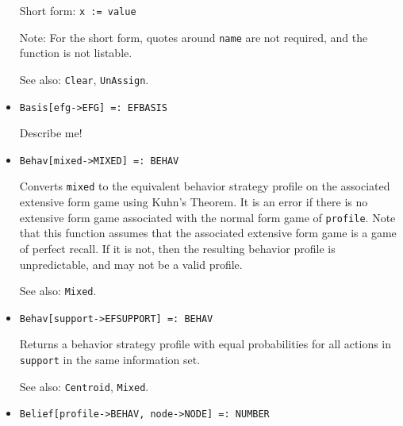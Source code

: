 \begin{itemize}
{\it for all types} {\tt T} 
\bd 
Creates a new variable \verb+name+, with return value of \verb+value+.
Returns the value assigned.  If \verb+name+ is already a defined
variable in the current scope, then if it is of type \verb+T+, it is
modified to have return value of \verb+value+.  If it is of a
different data type, an error results.
 
\item [Short form:] \verb+x := value+
\item [Note:] For the short form, quotes around \verb+name+ are not
required, and the function is not listable.
\item [See also:] \verb+Clear+, \verb+UnAssign+.
\ed


\item{}
\protect \large \begin{verbatim}
Basis[efg->EFG] =: EFBASIS
\end{verbatim}\normalsize

\bd
Describe me!
\ed

\item{}
\protect \large \begin{verbatim}
Behav[mixed->MIXED] =: BEHAV 
\end{verbatim}\normalsize

\bd 
Converts \verb+mixed+ to the equivalent behavior strategy profile on
the associated extensive form game using Kuhn's Theorem.  It is an
error if there is no extensive form game associated with the normal
form game of \verb+profile+.  Note that this function assumes that the
associated extensive form game is a game of perfect recall.  If it is
not, then the resulting behavior profile is unpredictable, and may not
be a valid profile.
\item [See also:] \verb+Mixed+.
\ed

\item{}
\protect \large \begin{verbatim}
Behav[support->EFSUPPORT] =: BEHAV 
\end{verbatim}\normalsize

\bd
Returns a behavior strategy profile with equal
probabilities for all actions in \verb+support+ in the same information set. 
\item [See also:] \verb+Centroid+, \verb+Mixed+.
\ed

\item{}
\protect \large \begin{verbatim}
Belief[profile->BEHAV, node->NODE] =: NUMBER 
\end{verbatim}\normalsize


\end{itemize}
